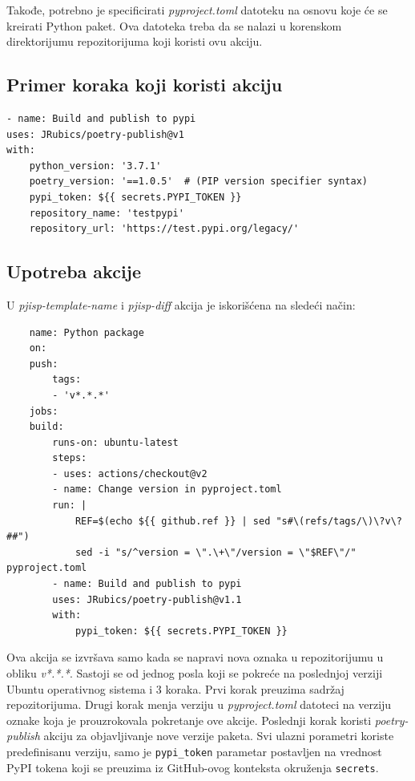 \documentclass[12pt]{report}
\begin{document}
Takođe, potrebno je specificirati \textit{pyproject.toml} datoteku na osnovu koje će se kreirati Python paket. Ova datoteka treba da se nalazi u korenskom direktorijumu repozitorijuma koji koristi ovu akciju.

\subsection{Primer koraka koji koristi akciju}

\begin{verbatim}
- name: Build and publish to pypi
uses: JRubics/poetry-publish@v1
with:
    python_version: '3.7.1'
    poetry_version: '==1.0.5'  # (PIP version specifier syntax)
    pypi_token: ${{ secrets.PYPI_TOKEN }}
    repository_name: 'testpypi'
    repository_url: 'https://test.pypi.org/legacy/'
\end{verbatim}

\subsection{Upotreba akcije}
U \textit{pjisp-template-name} i \textit{pjisp-diff} akcija je iskorišćena na sledeći način:
\begin{samepage}
    \begin{verbatim}
    name: Python package
    on:
    push:
        tags:
        - 'v*.*.*'
    jobs:
    build:
        runs-on: ubuntu-latest
        steps:
        - uses: actions/checkout@v2
        - name: Change version in pyproject.toml
        run: |
            REF=$(echo ${{ github.ref }} | sed "s#\(refs/tags/\)\?v\?##")
            sed -i "s/^version = \".\+\"/version = \"$REF\"/" pyproject.toml
        - name: Build and publish to pypi
        uses: JRubics/poetry-publish@v1.1
        with:
            pypi_token: ${{ secrets.PYPI_TOKEN }}
    \end{verbatim}
\end{samepage}

Ova akcija se izvršava samo kada se napravi nova oznaka u repozitorijumu u obliku \textit{v*.*.*}. Sastoji se od jednog posla koji se pokreće na poslednjoj verziji Ubuntu operativnog sistema i 3 koraka. Prvi korak preuzima sadržaj repozitorijuma. Drugi korak menja verziju u \textit{pyproject.toml} datoteci na verziju oznake koja je prouzrokovala pokretanje ove akcije. Poslednji korak koristi \textit{poetry-publish} akciju za objavljivanje nove verzije paketa. Svi ulazni porametri koriste predefinisanu verziju, samo je \texttt{pypi\_token} parametar postavljen na vrednost PyPI tokena koji se preuzima iz GitHub-ovog konteksta okruženja \texttt{secrets}.
\end{document}
